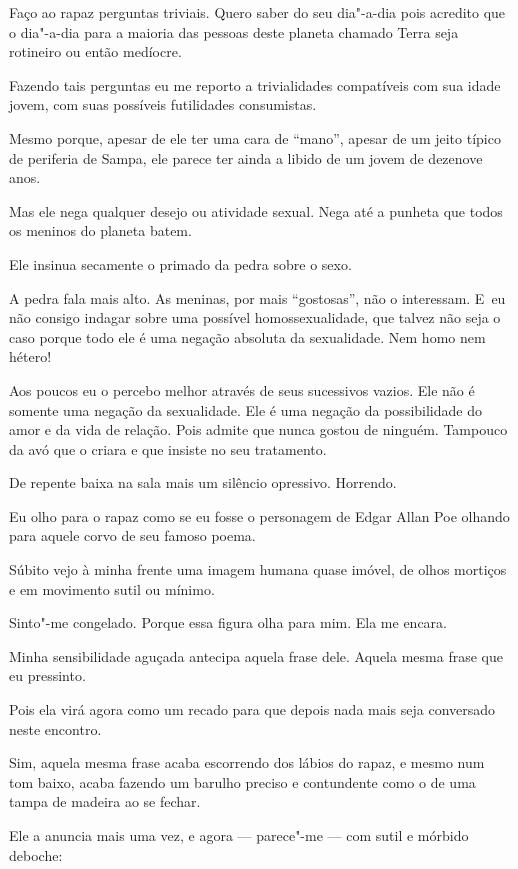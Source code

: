 \asterisc{}

Faço ao rapaz perguntas triviais. Quero saber do seu dia"-a-dia pois
acredito que o dia"-a-dia para a maioria das pessoas deste planeta
chamado Terra seja rotineiro ou então medíocre.

Fazendo tais perguntas eu me reporto a trivialidades compatíveis com sua
idade jovem, com suas possíveis futilidades consumistas.

Mesmo porque, apesar de ele ter uma cara de ``mano'', apesar de um jeito
típico de periferia  de Sampa, ele parece ter ainda a libido de um
jovem de dezenove anos.

Mas ele nega qualquer desejo ou atividade sexual. Nega até a punheta que
todos os meninos do planeta batem.

Ele insinua secamente o primado da pedra sobre o sexo.

A pedra fala mais alto. As meninas, por mais ``gostosas'', não o
interessam. E~eu não consigo indagar sobre uma possível
homossexualidade, que talvez não seja o caso porque todo ele é uma
negação absoluta da sexualidade. Nem homo nem hétero!

Aos poucos eu o percebo melhor através de seus sucessivos vazios. Ele
não é somente uma negação da sexualidade. Ele é uma negação da
possibilidade do amor e da vida de relação. Pois admite que nunca gostou
de ninguém. Tampouco da avó que o criara e que insiste no seu
tratamento.

\asterisc{}

De repente baixa na sala mais um silêncio opressivo. Horrendo.

Eu olho para o rapaz como se eu fosse o personagem de Edgar Allan Poe
olhando para aquele corvo de seu famoso poema.

Súbito vejo à minha frente uma imagem humana quase imóvel, de olhos
mortiços e em movimento sutil ou mínimo.

Sinto"-me congelado. Porque essa figura olha para mim. Ela me encara.

Minha sensibilidade aguçada antecipa aquela frase dele. Aquela mesma
frase que eu pressinto.

Pois ela virá agora como um recado para que depois nada mais seja
conversado neste encontro.

Sim, aquela mesma frase acaba escorrendo dos lábios do rapaz, e mesmo
num tom baixo, acaba fazendo um barulho preciso e contundente como o de
uma tampa de madeira ao se fechar.

Ele a anuncia mais uma vez, e agora --- parece"-me --- com sutil e
mórbido deboche:

